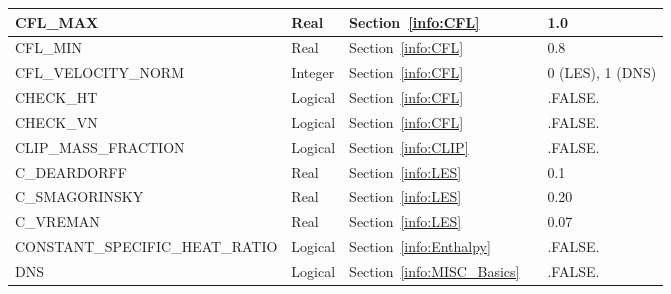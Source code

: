 \documentclass[11pt]{book}
\begin{document}
\begin{longtable}{@{\extracolsep{\fill}}|l|l|l|l|l|}
{\ct CFL\_MAX}                                  & Real          & Section~\ref{info:CFL}                                &               & 1.0               \\ \hline
{\ct CFL\_MIN}                                  & Real          & Section~\ref{info:CFL}                                &               & 0.8               \\ \hline
{\ct CFL\_VELOCITY\_NORM}                       & Integer       & Section~\ref{info:CFL}                                &               & 0 (LES), 1 (DNS)  \\ \hline
{\ct CHECK\_HT}                                 & Logical       & Section~\ref{info:CFL}                                &               & {\ct .FALSE.}     \\ \hline
{\ct CHECK\_VN}                                 & Logical       & Section~\ref{info:CFL}                                &               & {\ct .FALSE.}     \\ \hline
{\ct CLIP\_MASS\_FRACTION}                      & Logical       & Section~\ref{info:CLIP}                               &               & {\ct .FALSE.}     \\ \hline
{\ct C\_DEARDORFF}                              & Real          & Section~\ref{info:LES}                                &               & 0.1               \\ \hline
{\ct C\_SMAGORINSKY}                            & Real          & Section~\ref{info:LES}                                &               & 0.20              \\ \hline
{\ct C\_VREMAN}                                 & Real          & Section~\ref{info:LES}                                &               & 0.07              \\ \hline
{\ct CONSTANT\_SPECIFIC\_HEAT\_RATIO}           & Logical       & Section~\ref{info:Enthalpy}                           &               & {\ct .FALSE.}     \\ \hline
{\ct DNS}                                       & Logical       & Section~\ref{info:MISC_Basics}                        &               & {\ct .FALSE.}     \\ \hline

\end{longtable}
\end{document}
